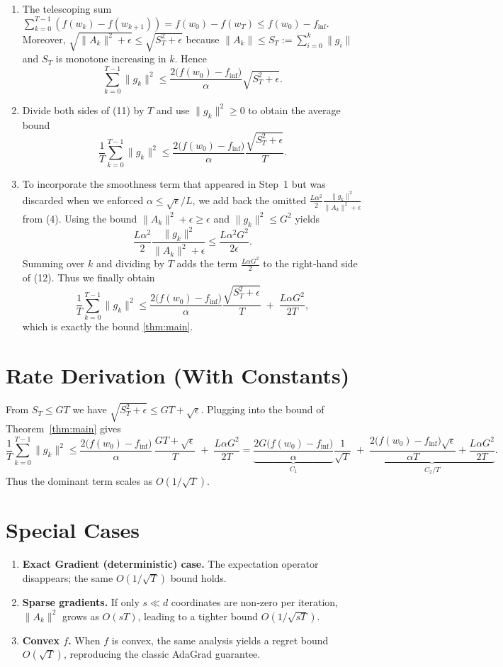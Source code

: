 \documentclass{article}
\begin{document}
\begin{enumerate}
\[\tag{10}
\]
\item[Step 10.] The telescoping sum $\sum_{k=0}^{T-1}(f(w_k)-f(w_{k+1}))
= f(w_0)-f(w_T)\le f(w_0)-f_{\inf}$.
Moreover, $\sqrt{\|A_k\|^{2}+\epsilon}\le
\sqrt{S_T^{2}+\epsilon}$ because $\|A_k\|\le S_T:=\sum_{i=0}^{k}\|g_i\|$
and $S_T$ is monotone increasing in $k$.
Hence
\[
\sum_{k=0}^{T-1}\|g_k\|^{2}
\le
\frac{2\bigl(f(w_0)-f_{\inf}\bigr)}{\alpha}
\sqrt{S_T^{2}+\epsilon}.
\tag{11}
\]
\item[Step 11.] Divide both sides of (11) by $T$ and use
$\|g_k\|^{2}\ge 0$ to obtain the average bound
\[
\frac{1}{T}\sum_{k=0}^{T-1}\|g_k\|^{2}
\le
\frac{2\bigl(f(w_0)-f_{\inf}\bigr)}{\alpha}
\frac{\sqrt{S_T^{2}+\epsilon}}{T}.
\tag{12}
\]
\item[Step 12.] To incorporate the smoothness term that appeared in
Step~1 but was discarded when we enforced $\alpha\le\sqrt{\epsilon}/L$, we
add back the omitted $ \frac{L\alpha^{2}}{2}\frac{\|g_k\|^{2}}{\|A_k\|^{2}+\epsilon}$
from (4). Using the bound $\|A_k\|^{2}+\epsilon\ge\epsilon$ and
$\|g_k\|^{2}\le G^{2}$ yields
\[
\frac{L\alpha^{2}}{2}\frac{\|g_k\|^{2}}{\|A_k\|^{2}+\epsilon}
\le \frac{L\alpha^{2}G^{2}}{2\epsilon}.
\]
Summing over $k$ and dividing by $T$ adds the term
$\frac{L\alpha G^{2}}{2}$ to the right‑hand side of (12).
Thus we finally obtain
\[
\frac{1}{T}\sum_{k=0}^{T-1}\|g_k\|^{2}
\le
\frac{2\bigl(f(w_0)-f_{\inf}\bigr)}{\alpha}
\frac{\sqrt{S_T^{2}+\epsilon}}{T}
\;+\;
\frac{L\alpha G^{2}}{2T},
\]
which is exactly the bound \eqref{thm:main}. \qedhere
\end{enumerate}

\section*{Rate Derivation (With Constants)}
From $S_T\le G T$ we have $\sqrt{S_T^{2}+\epsilon}\le G T+\sqrt{\epsilon}$.
Plugging into the bound of Theorem~\ref{thm:main} gives
\[
\frac{1}{T}\sum_{k=0}^{T-1}\|g_k\|^{2}
\le
\frac{2\bigl(f(w_0)-f_{\inf}\bigr)}{\alpha}\,
\frac{G T+\sqrt{\epsilon}}{T}
\;+\;
\frac{L\alpha G^{2}}{2T}
=
\underbrace{\frac{2G\bigl(f(w_0)-f_{\inf}\bigr)}{\alpha}}_{C_{1}}
\frac{1}{\sqrt{T}}
\;+\;
\underbrace{\frac{2\bigl(f(w_0)-f_{\inf}\bigr)\sqrt{\epsilon}}{\alpha T}
+\frac{L\alpha G^{2}}{2T}}_{C_{2}/T}.
\]
Thus the dominant term scales as $O(1/\sqrt{T})$.

\section*{Special Cases}
\begin{enumerate}
\item \textbf{Exact Gradient (deterministic) case.}
   The expectation operator disappears; the same $O(1/\sqrt{T})$ bound holds.
\item \textbf{Sparse gradients.}
   If only $s\ll d$ coordinates are non‑zero per iteration,
   $\|A_k\|^{2}$ grows as $O(sT)$, leading to a tighter bound
   $O(1/\sqrt{sT})$.
\item \textbf{Convex $f$.}
   When $f$ is convex, the same analysis yields a regret bound
   $O(\sqrt{T})$, reproducing the classic AdaGrad guarantee.
\end{enumerate}
\end{document}
